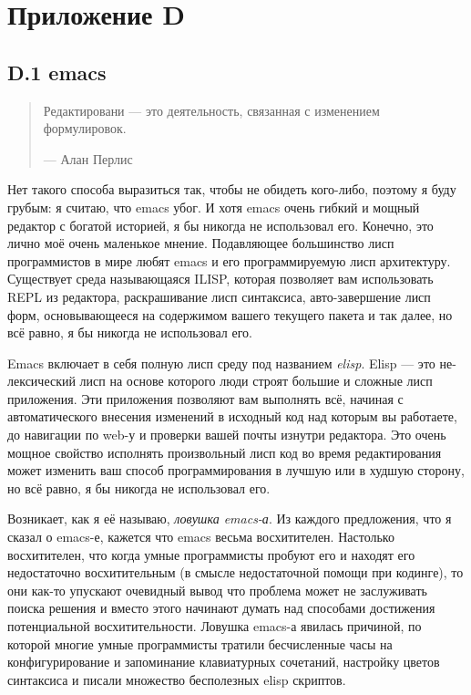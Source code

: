 \chapter*{Приложение D}

\section*{D.1 emacs}

\begin{quote}
Редактировани --- это деятельность, связанная с изменением формулировок.

--- Алан Перлис
\end{quote}

Нет такого способа выразиться так, чтобы не обидеть кого-либо, поэтому я буду грубым: я считаю, что emacs убог. И хотя emacs очень гибкий и мощный редактор с богатой историей, я бы никогда не использовал его. Конечно, это лично моё очень маленькое мнение. Подавляющее большинство лисп программистов в мире любят emacs и его программируемую лисп архитектуру. Существует среда называющаяся ILISP, которая позволяет вам использовать REPL из редактора, раскрашивание лисп синтаксиса, авто-завершение лисп форм, основывающееся на содержимом вашего текущего пакета и так далее, но всё равно, я бы никогда не использовал его.

Emacs включает в себя полную лисп среду под названием \emph{elisp}. Elisp --- это не-лексический лисп на основе которого люди строят большие и сложные лисп приложения. Эти приложения позволяют вам выполнять всё, начиная с автоматического внесения изменений в исходный код над которым вы работаете, до навигации по web-у и проверки вашей почты изнутри редактора. Это очень мощное свойство исполнять произвольный лисп код во время редактирования может изменить ваш способ программирования в лучшую или в худшую сторону, но всё равно, я бы никогда не использовал его.

Возникает, как я её называю, \emph{ловушка emacs-а}. Из каждого предложения, что я сказал о emacs-е, кажется что emacs весьма восхитителен. Настолько восхитителен, что когда умные программисты пробуют его и находят его недостаточно восхитительным (в смысле недостаточной помощи при кодинге), то они как-то упускают очевидный вывод что проблема может не заслуживать поиска решения и вместо этого начинают думать над способами достижения потенциальной восхитительности. Ловушка emacs-а явилась причиной, по которой многие умные программисты тратили бесчисленные часы на конфигурирование и запоминание клавиатурных сочетаний, настройку цветов синтаксиса и писали множество бесполезных elisp скриптов.

